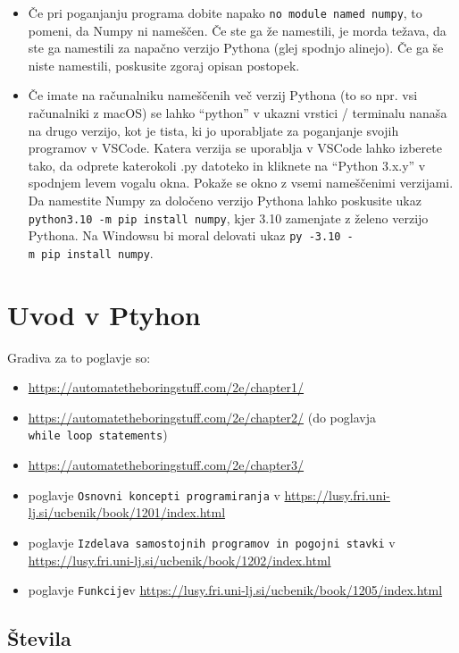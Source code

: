 \documentclass[
]{book}
\providecommand{\tightlist}{%
  \setlength{\itemsep}{0pt}\setlength{\parskip}{0pt}}
\begin{document}
\begin{itemize}
\item
  Če pri poganjanju programa dobite napako \texttt{no\ module\ named\ numpy}, to pomeni, da Numpy ni nameščen. Če ste ga že namestili, je morda težava, da ste ga namestili za napačno verzijo Pythona (glej spodnjo alinejo). Če ga še niste namestili, poskusite zgoraj opisan postopek.
\item
  Če imate na računalniku nameščenih več verzij Pythona (to so npr. vsi računalniki z macOS) se lahko ``python'' v ukazni vrstici / terminalu nanaša na drugo verzijo, kot je tista, ki jo uporabljate za poganjanje svojih programov v VSCode. Katera verzija se uporablja v VSCode lahko izberete tako, da odprete katerokoli .py datoteko in kliknete na ``Python 3.x.y'' v spodnjem levem vogalu okna. Pokaže se okno z vsemi nameščenimi verzijami. Da namestite Numpy za določeno verzijo Pythona lahko poskusite ukaz \texttt{python3.10\ -m\ pip\ install\ numpy}, kjer 3.10 zamenjate z želeno verzijo Pythona. Na Windowsu bi moral delovati ukaz \texttt{py\ -3.10\ -m\ pip\ install\ numpy}.
\end{itemize}

\hypertarget{uvod-v-ptyhon}{%
\chapter{Uvod v Ptyhon}\label{uvod-v-ptyhon}}

Gradiva za to poglavje so:

\begin{itemize}
\tightlist
\item
  \url{https://automatetheboringstuff.com/2e/chapter1/}
\item
  \url{https://automatetheboringstuff.com/2e/chapter2/} (do poglavja \texttt{while\ loop\ statements})
\item
  \url{https://automatetheboringstuff.com/2e/chapter3/}
\item
  poglavje \texttt{Osnovni\ koncepti\ programiranja} v \url{https://lusy.fri.uni-lj.si/ucbenik/book/1201/index.html}
\item
  poglavje \texttt{Izdelava\ samostojnih\ programov\ in\ pogojni\ stavki} v \url{https://lusy.fri.uni-lj.si/ucbenik/book/1202/index.html}
\item
  poglavje \texttt{Funkcije}v \url{https://lusy.fri.uni-lj.si/ucbenik/book/1205/index.html}
\end{itemize}

\hypertarget{ux161tevila}{%
\section{Števila}\label{ux161tevila}}
\end{document}
